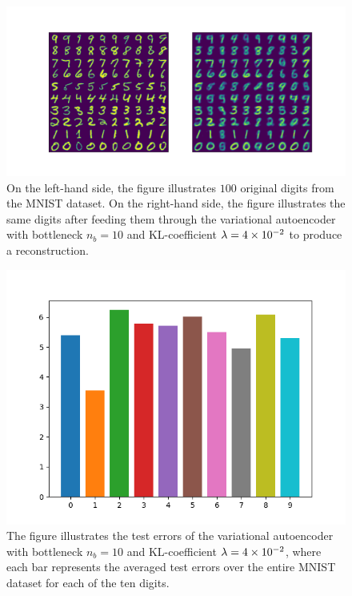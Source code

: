 \begin{figure}
\begin{center}
      \includegraphics[trim = 15mm 10mm 15mm 15mm, clip, width=\linewidth]{convolutional_VAE_snd_KL_4e-2_10k_epochs_10D_inference}
\end{center}
\caption{On the left-hand side, the figure illustrates $100$ original digits from the MNIST dataset. On the right-hand side, the figure illustrates the same digits after feeding them through the variational autoencoder with bottleneck $n_b=10$ and KL-coefficient $\lambda=\num{4e-2}$ to produce a reconstruction.}\label{fig:convolutional_VAE_snd_KL_4e-2_10k_epochs_10D_inference}
\end{figure}


\begin{figure}
\begin{center}
      \includegraphics[width=0.49\linewidth]{convolutional_VAE_snd_KL_4e-2_10k_epochs_10D_errors}
\end{center}
\caption{The figure illustrates the test errors of the variational autoencoder with bottleneck $n_b=10$ and KL-coefficient $\lambda = \num{4e-2}$, where each bar represents the averaged test errors over the entire MNIST dataset for each of the ten digits.}\label{fig:convolutional_VAE_snd_KL_4e-2_10k_epochs_10D_errors}
\end{figure}



